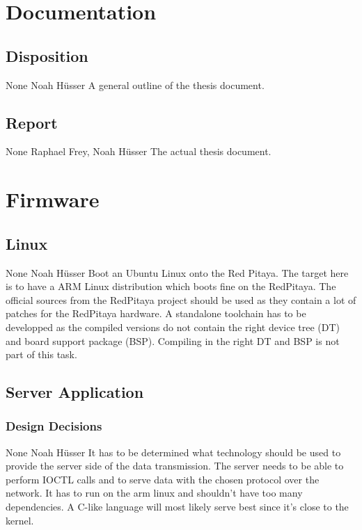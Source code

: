 \documentclass[a4paper,oneside]{alpenspecs/alpenspecs}
\begin{document}
\section{Documentation}
\label{sec:docs}

\subsection{Disposition}
\wpac
     {}
     {}
     {}
     {None}
     {}
     {Noah H\"usser}
     {%
        A general outline of the thesis document.%
     }

\subsection{Report}
\wpac
     {}
     {}
     {}
     {None}
     {}
     {Raphael Frey, Noah H\"usser}
     {%
        The actual thesis document.%
     }


\section{Firmware}
\label{sec:firmware}

\subsection{Linux}
\label{subsec:fw:linux}

\wpac
     {}
     {}
     {}
     {None}
     {}
     {Noah H\"usser}
     {%
        Boot an Ubuntu Linux onto the Red Pitaya.%
        The target here is to have a ARM Linux distribution which boots fine on the RedPitaya.
        The official sources from the RedPitaya project should be used as they contain a lot of patches for the RedPitaya hardware.
        A standalone toolchain has to be developped as the compiled versions do not contain the right device tree (DT) and board support package (BSP).
        Compiling in the right DT and BSP is not part of this task.
     }

\subsection{Server Application}
\label{subsec:fw:server}

\subsubsection{Design Decisions}
\label{subsubsec:fw:server:design-decisions}
\wpac
     {}
     {}
     {}
     {None}
     {}
     {Noah H\"usser}
     {%
         It has to be determined what technology should be used to provide the server side of the data transmission.
         The server needs to be able to perform IOCTL calls and to serve data with the chosen protocol over the network. It has to run on the arm linux and shouldn't have too many dependencies.
         A C-like language will most likely serve best since it's close to the kernel.
     }
\end{document}
